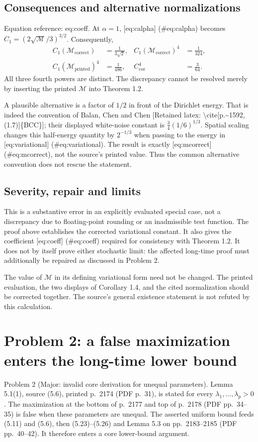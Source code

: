 \documentclass[10pt]{article}
\begin{document}
\subsection*{Consequences and alternative normalizations}
Equation reference: eq:coeff. At \(\alpha=1\), [eq:calpha] (\#eq:calpha) becomes \(C_1=(2\sqrt{\mathcal M}/3)^{3/2}\). Consequently, \[\begin{aligned}
 C_1(\mathcal M_{\mathrm{correct}})&=\frac1{3\sqrt2},
 &C_1(\mathcal M_{\mathrm{correct}})^4&=\frac1{324},\\
 C_1(\mathcal M_{\mathrm{printed}})^4&=\frac1{486},
 &C_{\mathrm{cor}}^4&=\frac3{64}. \nonumber\end{aligned}\] All three fourth powers are distinct. The discrepancy cannot be resolved merely by inserting the printed \(\mathcal M\) into Theorem 1.2.\par
A plausible alternative is a factor of \(1/2\) in front of the Dirichlet energy. That is indeed the convention of Balan, Chen and Chen [Retained latex: \textbackslash{}cite[p.\textasciitilde{}1592, (1.7)]\{BCC\}]; their displayed white-noise constant is \(\frac34(1/6)^{1/3}\). Spatial scaling changes this half-energy quantity by \(2^{-1/3}\) when passing to the energy in [eq:variational] (\#eq:variational). The result is exactly [eq:mcorrect] (\#eq:mcorrect), not the source’s printed value. Thus the common alternative convention does not rescue the statement.\par
\subsection*{Severity, repair and limits}
This is a substantive error in an explicitly evaluated special case, not a discrepancy due to floating-point rounding or an inadmissible test function. The proof above establishes the corrected variational constant. It also gives the coefficient [eq:coeff] (\#eq:coeff) required for consistency with Theorem 1.2. It does not by itself prove either stochastic limit: the affected long-time proof must additionally be repaired as discussed in Problem 2.\par
The value of \(\mathcal M\) in its defining variational form need not be changed. The printed evaluation, the two displays of Corollary 1.4, and the cited normalization should be corrected together. The source’s general existence statement is not refuted by this calculation.\par
\section*{Problem 2: a false maximization enters the long-time lower bound}
Problem 2 (Major: invalid core derivation for unequal parameters).  Lemma 5.1(1), source (5.6), printed p. 2174 (PDF p. 31), is stated for every \(\lambda_1,\ldots,\lambda_p>0\). The maximization at the bottom of p. 2177 and top of p. 2178 (PDF pp. 34–35) is false when these parameters are unequal. The asserted uniform bound feeds (5.11) and (5.6), then (5.23)–(5.26) and Lemma 5.3 on pp. 2183–2185 (PDF pp. 40–42). It therefore enters a core lower-bound argument.\par
\end{document}
